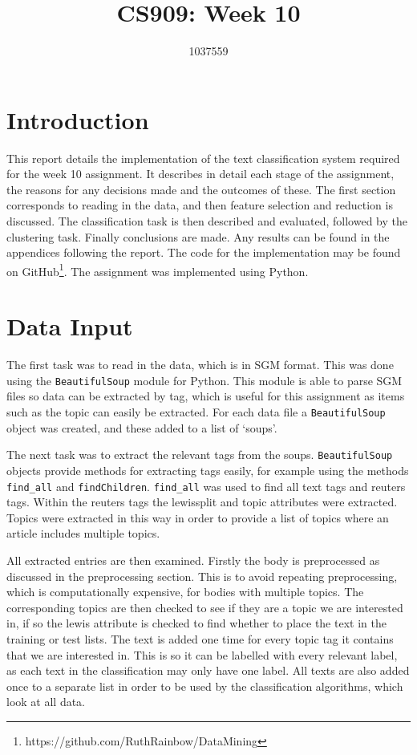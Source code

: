 \documentclass{article}
\title{CS909: Week 10}
\author{1037559}
\date{}
\begin{document}
\maketitle

\section{Introduction}
This report details the implementation of the text classification system required for the week 10 assignment. It describes in detail each stage of the assignment, the reasons for any decisions made and the outcomes of these. The first section corresponds to reading in the data, and then feature selection and reduction is discussed. The classification task is then described and evaluated, followed by the clustering task. Finally conclusions are made. Any results can be found in the appendices following the report. The code for the implementation may be found on GitHub\footnote{https://github.com/RuthRainbow/DataMining}. The assignment was implemented using Python.

\section{Data Input}
The first task was to read in the data, which is in SGM format. This was done using the \verb|BeautifulSoup| module for Python. This module is able to parse SGM files so data can be extracted by tag, which is useful for this assignment as items such as the topic can easily be extracted. For each data file a \verb|BeautifulSoup| object was created, and these added to a list of `soups'.

The next task was to extract the relevant tags from the soups. \verb|BeautifulSoup| objects provide methods for extracting tags easily, for example using the methods \verb|find_all| and \verb|findChildren|. \verb|find_all| was used to find all text tags and reuters tags. Within the reuters tags the lewissplit and topic attributes were extracted. Topics were extracted in this way in order to provide a list of topics where an article includes multiple topics.

All extracted entries are then examined. Firstly the body is preprocessed as discussed in the preprocessing section. This is to avoid repeating preprocessing, which is computationally expensive, for bodies with multiple topics. The corresponding topics are then checked to see if they are a topic we are interested in, if so the lewis attribute is checked to find whether to place the text in the training or test lists. The text is added one time for every topic tag it contains that we are interested in. This is so it can be labelled with every relevant label, as each text in the classification may only have one label. All texts are also added once to a separate list in order to be used by the classification algorithms, which look at all data.
\end{document}
